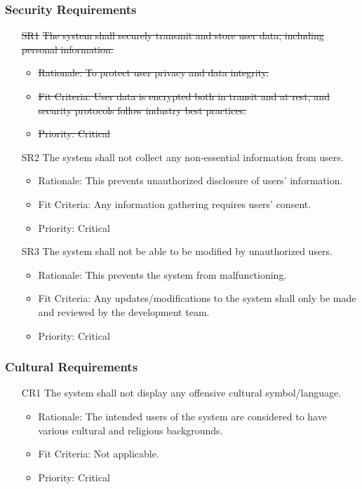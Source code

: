 \documentclass[12pt]{article}
\begin{document}
\subsubsection{Security Requirements}
\begin{itemize}
    \item[\sout{SR1}] \sout{The system shall securely transmit and store user data, including personal information.} \label{SR1}
    \begin{itemize}
        \item \sout{Rationale: To protect user privacy and data integrity.}
        \item \sout{Fit Criteria: User data is encrypted both in transit and at rest, and security protocols follow industry best practices.}
        \item \sout{Priority: Critical}
    \end{itemize}
\end{itemize}
\begin{itemize}
    \item[SR2] The system shall not collect any non-essential information from users. \label{SR2}
    \begin{itemize}
        \item Rationale: This prevents unauthorized disclosure of users' information.
        \item Fit Criteria: Any information gathering requires users’ consent.
        \item Priority: Critical
    \end{itemize}
\end{itemize}
\begin{itemize}
    \item[SR3] The system shall not be able to be modified by unauthorized users. \label{SR3}
    \begin{itemize}
        \item Rationale:  This prevents the system from malfunctioning.
        \item Fit Criteria: Any updates/modifications to the system shall only be
made and reviewed by the development team.
        \item Priority: Critical
    \end{itemize}
\end{itemize}
\subsubsection{Cultural Requirements}
\begin{itemize}
    \item[CR1] The system shall not display any offensive cultural symbol/language. \label{CR1}
    \begin{itemize}
        \item Rationale: The intended users of the system are considered to have various cultural and religious backgrounds.
        \item Fit Criteria: Not applicable.
        \item Priority: Critical
    \end{itemize}
\end{itemize}
\end{document}
